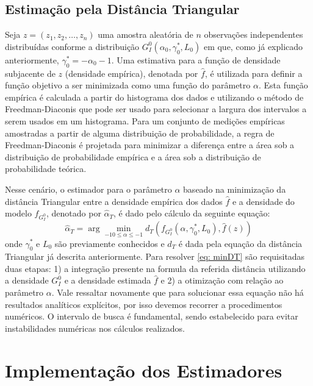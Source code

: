 \documentclass[12pt]{article}
\begin{document}
\subsection{Estimação pela Distância Triangular}

Seja $z = (z_1, z_2, \dots, z_n)$ uma amostra aleatória de $n$ observações independentes distribuídas conforme a distribuição $G_I^0(\alpha_0, \gamma_0^{*}, L_0)$ em que, como já explicado anteriormente, $\gamma_0^{*} = - \alpha_0 - 1$. Uma estimativa para a função de densidade subjacente de $z$ (densidade empírica), denotada por $\widehat{f}$, é utilizada para definir a função objetivo a ser minimizada como uma função do parâmetro $\alpha$. Esta função empírica é calculada a partir do histograma dos dados e utilizando o método de Freedman-Diaconis que pode ser usado para selecionar a largura dos intervalos a serem usados em um histograma. Para um conjunto de medições empíricas amostradas a partir de alguma distribuição de probabilidade, a regra de Freedman-Diaconis é projetada para minimizar a diferença entre a área sob a distribuição de probabilidade empírica e a área sob a distribuição de probabilidade teórica. 

Nesse cenário, o estimador para o parâmetro $\alpha$ baseado na minimização da distância Triangular entre a densidade empírica dos dados $\widehat{f}$ e a densidade do modelo $f_{G_I^0}$, denotado por $\widehat{\alpha}_{T}$, é dado pelo cálculo da seguinte equação:
\begin{equation}
    \widehat{\alpha}_{T} = \arg\min_{-10 \leq \alpha \leq -1} d_T(f_{G_I^0}(\alpha, \gamma_0^{*}, L_0), \widehat{f}(z)) 
    \label{eq: minDT}
\end{equation}
onde $\gamma_0^{*}$ e $L_0$ são previamente conhecidos e $d_T$ é dada pela equação da distância Triangular já descrita anteriormente. Para resolver \eqref{eq: minDT} são requisitadas duas etapas: 1) a integração presente na formula da referida distância utilizando a densidade $G_I^0$ e a densidade estimada $\widehat{f}$ e 2) a otimização com relação ao parâmetro $\alpha$. Vale ressaltar novamente que para solucionar essa equação não há resultados analíticos explícitos, por isso devemos recorrer a procedimentos numéricos. O intervalo de busca é fundamental, sendo estabelecido para evitar instabilidades numéricas nos cálculos realizados.


\section{Implementação dos Estimadores}
\end{document}
